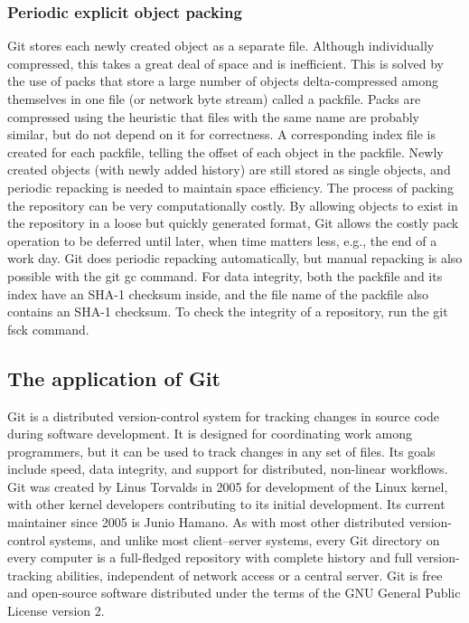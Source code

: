 \documentclass[a4paper]{report}
\begin{document}
\subsubsection{Periodic explicit object packing}
Git stores each newly created object as a separate file. Although individually compressed, this takes a great deal of space and is inefficient. This is solved by the use of packs that store a large number of objects delta-compressed among themselves in one file (or network byte stream) called a packfile. Packs are compressed using the heuristic that files with the same name are probably similar, but do not depend on it for correctness. A corresponding index file is created for each packfile, telling the offset of each object in the packfile. Newly created objects (with newly added history) are still stored as single objects, and periodic repacking is needed to maintain space efficiency. The process of packing the repository can be very computationally costly. By allowing objects to exist in the repository in a loose but quickly generated format, Git allows the costly pack operation to be deferred until later, when time matters less, e.g., the end of a work day. Git does periodic repacking automatically, but manual repacking is also possible with the git gc command. For data integrity, both the packfile and its index have an SHA-1 checksum inside, and the file name of the packfile also contains an SHA-1 checksum. To check the integrity of a repository, run the git fsck command.
\subsection{The application of Git}

Git is a distributed version-control system for tracking changes in source code during software development. It is designed for coordinating work among programmers, but it can be used to track changes in any set of files. Its goals include speed, data integrity, and support for distributed, non-linear workflows.
Git was created by Linus Torvalds in 2005 for development of the Linux kernel, with other kernel developers contributing to its initial development. Its current maintainer since 2005 is Junio Hamano.
As with most other distributed version-control systems, and unlike most client–server systems, every Git directory on every computer is a full-fledged repository with complete history and full version-tracking abilities, independent of network access or a central server.
Git is free and open-source software distributed under the terms of the GNU General Public License version 2.
\end{document}
